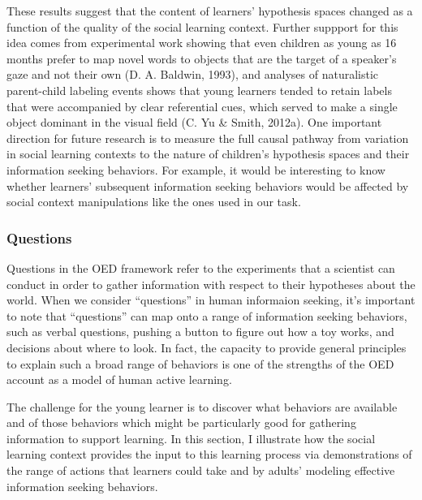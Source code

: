 \documentclass[english,man]{apa6}
\theoremstyle{definition}
\theoremstyle{definition}
\theoremstyle{definition}
\theoremstyle{remark}
\begin{document}
These results suggest that the content of learners' hypothesis spaces
changed as a function of the quality of the social learning context.
Further suppport for this idea comes from experimental work showing that
even children as young as 16 months prefer to map novel words to objects
that are the target of a speaker's gaze and not their own (D. A.
Baldwin, 1993), and analyses of naturalistic parent-child labeling
events shows that young learners tended to retain labels that were
accompanied by clear referential cues, which served to make a single
object dominant in the visual field (C. Yu \& Smith, 2012a). One
important direction for future research is to measure the full causal
pathway from variation in social learning contexts to the nature of
children's hypothesis spaces and their information seeking behaviors.
For example, it would be interesting to know whether learners'
subsequent information seeking behaviors would be affected by social
context manipulations like the ones used in our task.

\subsubsection{Questions}\label{questions}

Questions in the OED framework refer to the experiments that a scientist
can conduct in order to gather information with respect to their
hypotheses about the world. When we consider \enquote{questions} in
human informaion seeking, it's important to note that
\enquote{questions} can map onto a range of information seeking
behaviors, such as verbal questions, pushing a button to figure out how
a toy works, and decisions about where to look. In fact, the capacity to
provide general principles to explain such a broad range of behaviors is
one of the strengths of the OED account as a model of human active
learning.

The challenge for the young learner is to discover what behaviors are
available and of those behaviors which might be particularly good for
gathering information to support learning. In this section, I illustrate
how the social learning context provides the input to this learning
process via demonstrations of the range of actions that learners could
take and by adults' modeling effective information seeking behaviors.
\end{document}
